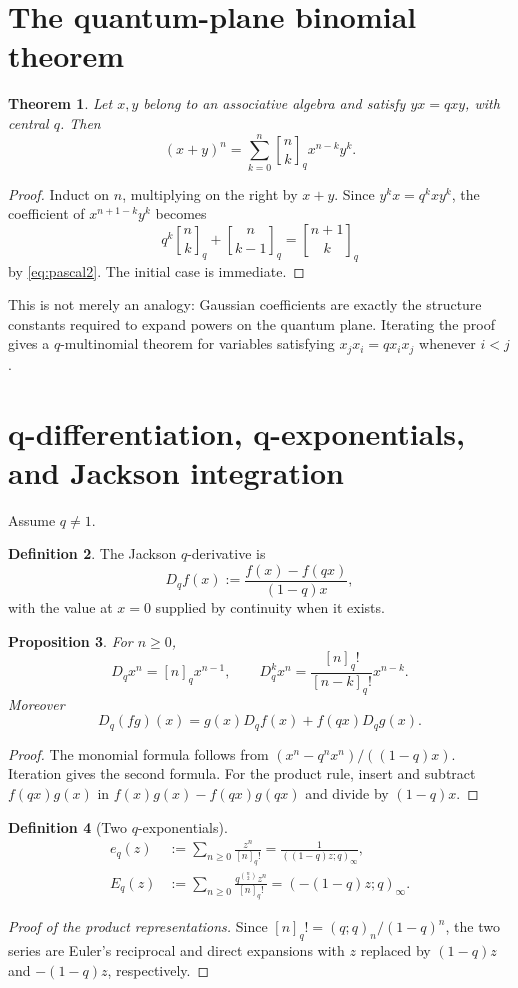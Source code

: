 \documentclass[11pt]{article}
\numberwithin{equation}{section}
\newtheorem{theorem}{Theorem}[section]
\newtheorem{proposition}[theorem]{Proposition}
\theoremstyle{definition}
\newtheorem{definition}[theorem]{Definition}
\newcommand{\qbinom}[2]{\genfrac{[}{]}{0pt}{}{#1}{#2}_{q}}
\begin{document}
\section{The quantum-plane binomial theorem}
\begin{theorem}
Let $x,y$ belong to an associative algebra and satisfy $yx=qxy$, with central $q$.  Then
\[
(x+y)^n=\sum_{k=0}^n\qbinom nk x^{n-k}y^k.
\]
\end{theorem}
\begin{proof}
Induct on $n$, multiplying on the right by $x+y$.  Since $y^kx=q^kxy^k$, the coefficient of $x^{n+1-k}y^k$ becomes
\[
q^k\qbinom nk+\qbinom n{k-1}=\genfrac{[}{]}{0pt}{}{n+1}{k}_q
\]
by \eqref{eq:pascal2}.  The initial case is immediate.
\end{proof}

This is not merely an analogy: Gaussian coefficients are exactly the structure constants required to expand powers on the quantum plane.  Iterating the proof gives a $q$-multinomial theorem for variables satisfying $x_jx_i=qx_ix_j$ whenever $i<j$.

\section{q-differentiation, q-exponentials, and Jackson integration}
Assume $q\ne1$.
\begin{definition}
The Jackson $q$-derivative is
\[
D_qf(x):=\frac{f(x)-f(qx)}{(1-q)x},
\]
with the value at $x=0$ supplied by continuity when it exists.
\end{definition}

\begin{proposition}
For $n\ge0$,
\[
D_qx^n=[n]_qx^{n-1},\qquad
D_q^kx^n=\frac{[n]_q!}{[n-k]_q!}x^{n-k}.
\]
Moreover
\[
D_q(fg)(x)=g(x)D_qf(x)+f(qx)D_qg(x).
\]
\end{proposition}
\begin{proof}
The monomial formula follows from $(x^n-q^nx^n)/((1-q)x)$.  Iteration gives the second formula.  For the product rule, insert and subtract $f(qx)g(x)$ in $f(x)g(x)-f(qx)g(qx)$ and divide by $(1-q)x$.
\end{proof}

\begin{definition}[Two $q$-exponentials]
\begin{align*}
e_q(z)&:=\sum_{n\ge0}\frac{z^n}{[n]_q!}
      =\frac1{((1-q)z;q)_\infty},\\
E_q(z)&:=\sum_{n\ge0}\frac{q^{\binom n2}z^n}{[n]_q!}
      =(-(1-q)z;q)_\infty.
\end{align*}
\end{definition}
\begin{proof}[Proof of the product representations]
Since $[n]_q!=(q;q)_n/(1-q)^n$, the two series are Euler's reciprocal and direct expansions with $z$ replaced by $(1-q)z$ and $-(1-q)z$, respectively.
\end{proof}
\end{document}
